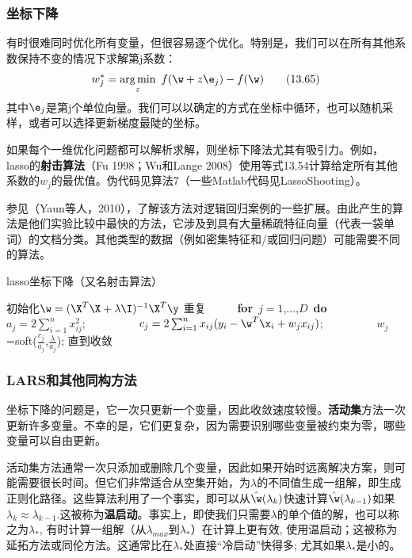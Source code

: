 \documentclass[a4paper]{article}
\DeclareMathOperator*{\argmin}{arg\,min}
\begin{document}
\subsubsection{坐标下降}
有时很难同时优化所有变量，但很容易逐个优化。特别是，我们可以在所有其他系数保持不变的情况下求解第j系数：
\begin{equation}
	w_j^*=\argmin_z\ f(\w+z\e_j)-f(\w)\tag{13.65}
\end{equation}
其中$\e_j$是第j个单位向量。我们可以以确定的方式在坐标中循环，也可以随机采样，或者可以选择更新梯度最陡的坐标。

如果每个一维优化问题都可以解析求解，则坐标下降法尤其有吸引力。例如，lasso的\textbf{射击算法}（Fu 1998；Wu和Lange 2008）使用等式13.54计算给定所有其他系数的$w_j$的最优值。伪代码见算法7（一些Matlab代码见LassoShooting）。

参见（Yaun等人，2010），了解该方法对逻辑回归案例的一些扩展。由此产生的算法是他们实验比较中最快的方法，它涉及到具有大量稀疏特征向量（代表一袋单词）的文档分类。其他类型的数据（例如密集特征和/或回归问题）可能需要不同的算法。


\renewcommand{\thealgorithm}{13.1}
\begin{algorithm}
	\caption{lasso坐标下降（又名射击算法）}
	\label{alg:A}
	\begin{algorithmic}[1]
		\STATE 初始化$\w=(\X^T\X+\lambda\I)^{-1}\X^T\y$
		\STATE 重复
		\STATE \ \ \ \ \ \textbf{for}\ $j=1$,...,$D$\ \textbf{do}
		\STATE \ \ \ \ \ \ \ \ \  $a_j=2\sum\nolimits_{i=1}^nx_{ij}^2$;
		\STATE \ \ \ \ \ \ \ \ \  $c_j=2\sum\nolimits_{i=1}^nx_{ij}(y_i-\w^T\x_i+w_jx_{ij})$;
		\STATE \ \ \ \ \ \ \ \ \ $w_j$=soft($\frac{c_j}{a_j}$,$\frac{\lambda}{a_j}$);
		\STATE 直到收敛
	\end{algorithmic}
\end{algorithm}
\subsubsection{LARS和其他同构方法}
坐标下降的问题是，它一次只更新一个变量，因此收敛速度较慢。\textbf{活动集}方法一次更新许多变量。不幸的是，它们更复杂，因为需要识别哪些变量被约束为零，哪些变量可以自由更新。

活动集方法通常一次只添加或删除几个变量，因此如果开始时远离解决方案，则可能需要很长时间。但它们非常适合从空集开始，为$\lambda$的不同值生成一组解，即生成正则化路径。这些算法利用了一个事实，即可以从$\hat{\w}(\lambda_k)$快速计算$\hat{\w}(\lambda_{k-1})$如果$\lambda_k\approx \lambda_{k-1}$.这被称为\textbf{温启动}。事实上，即使我们只需要$\lambda$的单个值的解，也可以称之为$\lambda_*$, 有时计算一组解（从$\lambda_{max}$到$\lambda_*$）在计算上更有效, 使用温启动；这被称为延拓方法或同伦方法。这通常比在$\lambda_*$处直接“冷启动”快得多; 尤其如果$\lambda_*$是小的。
\end{document}
